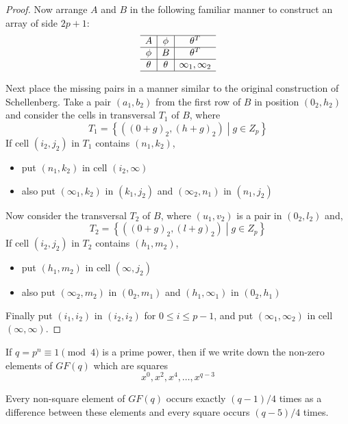 \begin{proof}
Now arrange $A$ and $B$ in the following familiar manner to construct an array of side $2p + 1$:
\begin{equation}
\begin{array}{c|c|c}
\hline
      A     &   \phi   &       \theta ^T   \\ \hline
     \phi   &    B     &       \theta ^T   \\ \hline
    \theta  &  \theta  &  \infty _1, \infty _2  \\ \hline
\end{array}
\end{equation}

Next place the missing pairs in a manner similar to the original construction of Schellenberg.
Take a pair $(a_1, b_2)$ from the first row of $B$ in position $(0_2, h_2)$ and consider the cells in transversal $T_1$ of $B$, where $$T_1 = \left \{((0 + g)_2,(h + g)_2) \middle| g \in Z_p \right \}$$
If cell $(i_2, j_2)$ in $T_1$ contains $(n_1, k_2)$,
\begin{itemize}
  \item{put $(n_1, k_2)$ in cell $(i_2, \infty)$}
  \item{also put $(\infty _1, k_2)$ in $(k_1, j_2)$ and
    $(\infty _2, n_1)$ in $(n_1, j_2)$}
\end{itemize}

Now consider the transversal $T_2$ of $B$, where $(u_1, v_2)$ is a pair in $(0_2, l_2)$ and,
\begin{equation}
T_2 = \left \{((0 + g)_2, (l + g)_2) \middle| g \in Z_p \right \}
\end{equation}
If cell $(i_2, j_2)$ in $T_2$ contains $(h_1, m_2)$,
\begin{itemize}
  \item{put $(h_1, m_2)$ in cell $(\infty, j_2)$}
  \item{also put $(\infty _2, m_2)$ in $(0_2, m_1)$ and
    $(h_1, \infty _1)$ in $(0_2,h_1)$}
\end{itemize}

Finally put $(i_1, i_2)$ in $(i_2, i_2)$ for $0 \leq i \leq p - 1$, and put $(\infty _1, \infty _2)$ in cell $(\infty, \infty)$.
\end{proof}

\begin{lemma}
If $q = p^n \equiv 1\pmod 4$ is a prime power, then if we write down the non-zero elements of $GF(q)$ which are squares
\begin{equation}
 x^0, x^2, x^4, \ldots, x^{q - 3}
\end{equation}

Every non-square element of $GF(q)$ occurs exactly $(q - 1)/4$ times as a difference between these elements and every square occurs $(q - 5)/4$ times.
\end{lemma}

